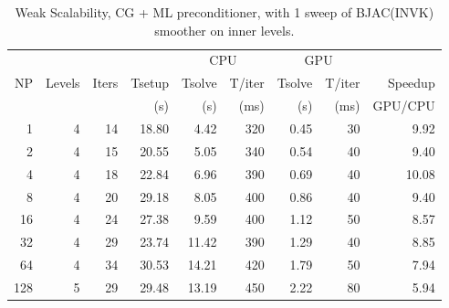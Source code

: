 \begin{table}[h!]
\centering
\label{gpu-invk}
\begin{tabular}{rrrrrrrrr}
    &        &       &        & \multicolumn{2}{c}{CPU} & \multicolumn{2}{c}{GPU} & \\
NP  & Levels & Iters & Tsetup & Tsolve & T/iter  & Tsolve & T/iter  & Speedup\\
    &        &       & (s)    & (s)    & (ms)    & (s)    & (ms)    & GPU/CPU \\
\hline
1   & 4       & 14  & 18.80 & 4.42  & 320    & 0.45 & 30   &  9.92  \\
2   & 4       & 15  & 20.55 & 5.05  & 340    & 0.54 & 40   &  9.40  \\
4   & 4       & 18  & 22.84 & 6.96  & 390    & 0.69 & 40   &  10.08 \\
8   & 4       & 20  & 29.18 & 8.05  & 400    & 0.86 & 40   &  9.40  \\
16  & 4       & 24  & 27.38 & 9.59  & 400    & 1.12 & 50   &  8.57  \\
32  & 4       & 29  & 23.74 & 11.42 & 390    & 1.29 & 40   &  8.85  \\
64  & 4       & 34  & 30.53 & 14.21 & 420    & 1.79 & 50   &  7.94  \\
128 & 5       & 29  & 29.48 & 13.19 & 450    & 2.22 & 80   &  5.94  \\
\hline
\end{tabular}
\caption{Weak Scalability,  CG + ML preconditioner,  with 1 sweep of BJAC(INVK) smoother on inner levels.}
\end{table}

